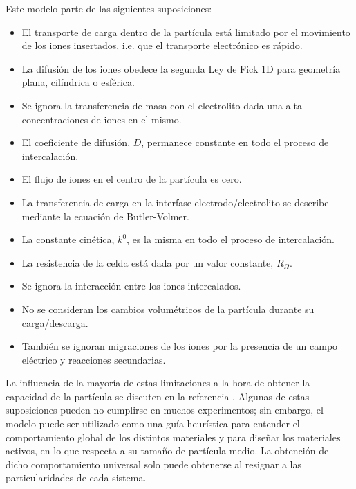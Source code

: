 Este modelo parte de las siguientes suposiciones:
\begin{itemize}
    \item El transporte de carga dentro de la partícula está limitado por el
        movimiento de los iones insertados, i.e. que el transporte electrónico
        es rápido.
    \item La difusión de los iones obedece la segunda Ley de Fick 1D para 
        geometría plana, cilíndrica o esférica.
    \item Se ignora la transferencia de masa con el electrolito dada una alta 
        concentraciones de iones en el mismo.
    \item El coeficiente de difusión, $D$, permanece constante en todo el 
        proceso de intercalación.
    \item El flujo de iones en el centro de la partícula es cero.
    \item La transferencia de carga en la interfase electrodo/electrolito se 
        describe mediante la ecuación de Butler-Volmer.
    \item La constante cinética, $k^0$, es la misma en todo el proceso de 
        intercalación.
    \item La resistencia de la celda está dada por un valor constante, 
        $R_{\Omega}$.
    \item Se ignora la interacción entre los iones intercalados.
    \item No se consideran los cambios volumétricos de la partícula durante su 
        carga/descarga.
    \item También se ignoran migraciones de los iones por la presencia de un 
        campo eléctrico y reacciones secundarias.
\end{itemize}
La influencia de la mayoría de estas limitaciones a la hora de obtener la 
capacidad de la partícula se discuten en la referencia \cite{gavilan2023}. Algunas
de estas suposiciones pueden no cumplirse en muchos experimentos; sin embargo, el 
modelo puede ser utilizado como una guía heurística para entender el 
comportamiento global de los distintos materiales y para diseñar los materiales
activos, en lo que respecta a su tamaño de partícula medio. La obtención de dicho
comportamiento universal solo puede obtenerse al resignar a las particularidades
de cada sistema. 

